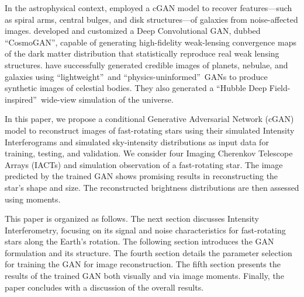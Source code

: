 In the astrophysical context, \cite{schawinski2017galaxypics} employed a cGAN model to recover features—such as spiral arms, central bulges, and disk structures—of galaxies from noise-affected images. \cite{mustafa2019cosmogan} developed and customized a Deep Convolutional GAN, dubbed \textquotedblleft CosmoGAN\textquotedblright, capable of generating high-fidelity weak-lensing convergence maps of the dark matter distribution that statistically reproduce real weak lensing structures. \cite{coccomini2021lightweightgan} have successfully generated credible images of planets, nebulae, and galaxies using \textquotedblleft lightweight\textquotedblright\ and \textquotedblleft physics-uninformed\textquotedblright\ GANs to produce synthetic images of celestial bodies. They also generated a \textquotedblleft Hubble Deep Field-inspired\textquotedblright\ wide-view simulation of the universe. 

In this paper, we propose a conditional Generative Adversarial Network (cGAN) model \citep{isola2017image} to reconstruct images of fast-rotating stars using their simulated Intensity Interferograms and simulated sky-intensity distributions as input data for training, testing, and validation. We consider four Imaging Cherenkov Telescope Arrays (IACTs) and simulation observation of a fast-rotating star. The image predicted by the trained GAN shows promising results in reconstructing the star’s shape and size. The reconstructed brightness distributions are then assessed using moments.

This paper is organized as follows. The next section discusses Intensity Interferometry, focusing on its signal and noise characteristics for fast-rotating stars along the Earth’s rotation. The following section introduces the GAN formulation and its structure. The fourth section details the parameter selection for training the GAN for image reconstruction. The fifth section presents the results of the trained GAN both visually and via image moments. Finally, the paper concludes with a discussion of the overall results.

